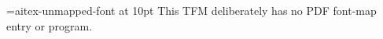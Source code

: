 \documentclass{article}
\begin{document}
\font\unmapped=aitex-unmapped-font at 10pt
{\unmapped This TFM deliberately has no PDF font-map entry or program.}
\end{document}
